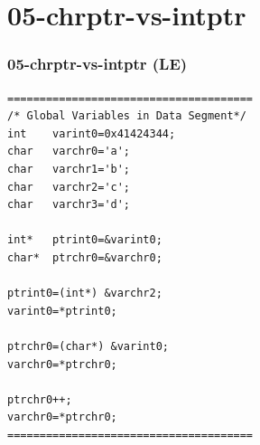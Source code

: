 \documentclass[aspectratio=169, xcolor=table, notheorems, hyperref={pdfpagelabels=false}]{beamer}
\begin{document}
\begin{frame}[fragile]
\begin{minipage}[t]{120mm}
\end{minipage}

\end{frame}

\section{05-chrptr-vs-intptr}
\begin{frame}[fragile]

\frametitle{05-chrptr-vs-intptr (LE)}
\begin{lstlisting}[basicstyle=\ttfamily\footnotesize]
======================================
/* Global Variables in Data Segment*/
int    varint0=0x41424344;
char   varchr0='a';
char   varchr1='b';
char   varchr2='c';
char   varchr3='d';

int*   ptrint0=&varint0;
char*  ptrchr0=&varchr0;

ptrint0=(int*) &varchr2;
varint0=*ptrint0;

ptrchr0=(char*) &varint0;
varchr0=*ptrchr0;

ptrchr0++;
varchr0=*ptrchr0;
======================================
\end{lstlisting}

\end{frame}
\end{document}
